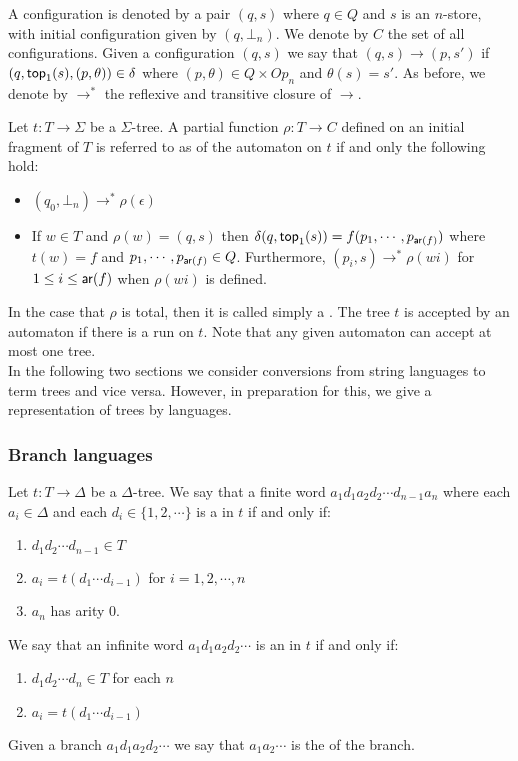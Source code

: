 A configuration is denoted by a pair $(q,s)$ where $q \in Q$ and
$s$ is an $n$-store, with initial configuration given by $(q,
\bot_n)$. We denote by $C$ the set of all configurations. Given a
configuration $(q,s)$ we say that $(q, s) \rightarrow (p, s')$ if
$(q, {\sf top}_1(s), (p, \theta)) \in \delta$ where $(p, \theta) \in
Q \times Op_n$ and $\theta(s) = s'$. As before, we denote by
$\rightarrow^*$ the reflexive and transitive closure of
$\rightarrow$.

Let $t: T \rightarrow \Sigma$ be a $\Sigma$-tree. A partial
function $\rho : T \rightarrow C$ defined on an initial fragment
of $T$ is referred to as  of the automaton
on $t$ if and only the following hold:
\begin{itemize}
\item $(q_0, \bot_n) \rightarrow^* \rho(\epsilon)$ \item If $w \in
T$ and $\rho(w) = (q,s)$ then $\delta(q, {\sf top}_1(s)) = f( p_1,
\cdots, p_{{\sf ar}(f)})$ where $t(w) = f$ and $p_1, \cdots,
p_{{\sf ar}(f)} \in Q$. Furthermore, $(p_i, s) \rightarrow^*
\rho(wi)$ for $1 \leq i \leq {\sf ar}(f)$ when $\rho(wi)$ is
defined.
\end{itemize}
In the case that $\rho$ is total, then it is called simply a
. The tree $t$ is accepted by an automaton if there
is a run on $t$. Note that any given automaton can accept at most
one tree.\\

In the following two sections we consider conversions from string
languages to term trees and vice versa. However, in preparation
for this, we give a representation of trees by languages.

\subsubsection*{Branch languages}

Let $t: T \rightarrow \Delta$ be a $\Delta$-tree. We say that a
finite word $a_1d_1a_2d_2 \cdots d_{n-1} a_n$ where each $a_i \in
\Delta$ and each $d_i \in \{1, 2, \cdots \}$ is a
 in $t$ if and only if:
\begin{enumerate}
\item $d_1d_2 \cdots d_{n-1} \in T$ \item $a_i = t(d_1 \cdots
d_{i-1})$ for $i = 1, 2, \cdots, n$ \item $a_n$ has arity $0$.
\end{enumerate}
We say that an infinite word $a_1d_1a_2d_2 \cdots$ is an
 in $t$ if and only if:
\begin{enumerate}
\item $d_1d_2 \cdots d_n \in T$ for each $n$ \item $a_i = t(d_1
\cdots d_{i-1})$
\end{enumerate}
Given a branch $a_1d_1a_2d_2 \cdots$ we say that $a_1a_2 \cdots$
is the  of the branch.

